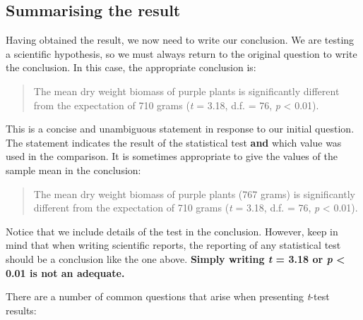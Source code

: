 \documentclass[
]{book}
\begin{document}
\hypertarget{summarising-the-result}{%
\subsection{Summarising the result}\label{summarising-the-result}}

Having obtained the result, we now need to write our conclusion. We are testing a scientific hypothesis, so we must always return to the original question to write the conclusion. In this case, the appropriate conclusion is:

\begin{quote}
The mean dry weight biomass of purple plants is significantly different from the expectation of 710 grams (\emph{t} = 3.18, d.f. = 76, \emph{p} \textless{} 0.01).
\end{quote}

This is a concise and unambiguous statement in response to our initial question. The statement indicates the result of the statistical test \textbf{and} which value was used in the comparison. It is sometimes appropriate to give the values of the sample mean in the conclusion:

\begin{quote}
The mean dry weight biomass of purple plants (767 grams) is significantly different from the expectation of 710 grams (\emph{t} = 3.18, d.f. = 76, \emph{p} \textless{} 0.01).
\end{quote}

Notice that we include details of the test in the conclusion. However, keep in mind that when writing scientific reports, the reporting of any statistical test should be a conclusion like the one above. \textbf{Simply writing \emph{t} = 3.18 or \emph{p} \textless{} 0.01 is not an adequate.}

There are a number of common questions that arise when presenting \emph{t}-test results:
\end{document}
